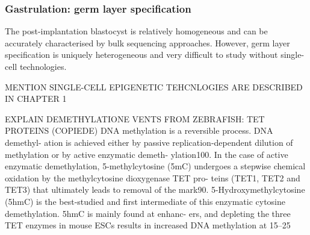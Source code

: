 \subsubsection{Gastrulation: germ layer specification}
The post-implantation blastocyst is relatively homogeneous and can be accurately characterised by bulk sequencing approaches. However, germ layer specification is uniquely heterogeneous and very difficult to study without single-cell technologies.

MENTION SINGLE-CELL EPIGENETIC TEHCNLOGIES ARE DESCRIBED IN CHAPTER 1

EXPLAIN DEMETHYLATIONE VENTS FROM ZEBRAFISH: TET PROTEINS\tabularnewline
(COPIEDE) DNA methylation is a reversible process. DNA demethyl- ation is achieved either by passive replication-dependent dilution of methylation or by active enzymatic demeth- ylation100. In the case of active enzymatic demethylation, 5-methylcytosine (5mC) undergoes a stepwise chemical oxidation by the methylcytosine dioxygenase TET pro- teins (TET1, TET2 and TET3) that ultimately leads to removal of the mark90. 5-Hydroxymethylcytosine (5hmC) is the best-studied and first intermediate of this enzymatic cytosine demethylation. 5hmC is mainly found at enhanc- ers, and depleting the three TET enzymes in mouse ESCs results in increased DNA methylation at 15–25%

